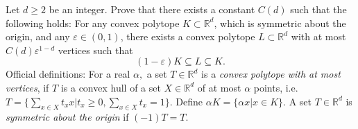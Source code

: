 Let $d \ge 2$ be an integer. Prove that there exists a constant $C(d)$ such that the following holds: For any convex polytope $K\subset \mathbb{R}^d$, which is symmetric about the origin, and any $\varepsilon \in (0, 1)$, there exists a convex polytope $L \subset \mathbb{R}^d$ with at most $C(d) \varepsilon^{1-d}$ vertices such that
\[(1-\varepsilon)K \subseteq L \subseteq K.\]
Official definitions: For a real $\alpha,$ a set $T \in \mathbb{R}^d$ is a \textit{convex polytope with at most  vertices}, if $T$ is a convex hull of a set $X \in \mathbb{R}^d$ of at most $\alpha$ points, i.e. $T = \{\sum\limits_{x\in X} t_x x | t_x \ge 0, \sum\limits_{x \in X} t_x = 1\}.$ Define $\alpha K = \{\alpha x | x \in K\}.$ A set $T \in \mathbb{R}^d$ is \textit{symmetric about the origin} if $(-1)T = T.$